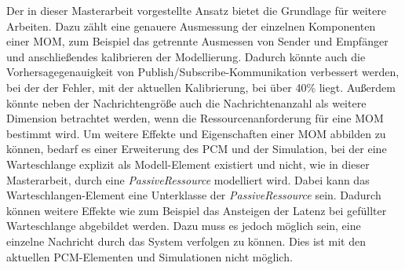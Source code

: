 Der in dieser Masterarbeit vorgestellte Ansatz bietet die Grundlage für weitere Arbeiten. Dazu zählt eine genauere Ausmessung der einzelnen Komponenten einer MOM, zum Beispiel das getrennte Ausmessen von Sender und Empfänger und anschließendes kalibrieren der Modellierung. Dadurch könnte auch die Vorhersagegenauigkeit von Publish/Subscribe-Kommunikation verbessert werden, bei der der Fehler, mit der aktuellen Kalibrierung, bei über 40\% liegt. Außerdem könnte neben der Nachrichtengröße auch die Nachrichtenanzahl als weitere Dimension betrachtet werden, wenn die Ressourcenanforderung für eine MOM bestimmt wird. Um weitere Effekte und Eigenschaften einer MOM abbilden zu können, bedarf es einer Erweiterung des PCM und der Simulation, bei der eine Warteschlange explizit als Modell-Element existiert und nicht, wie in dieser Masterarbeit, durch eine \emph{PassiveRessource} modelliert wird. Dabei kann das Warteschlangen-Element eine Unterklasse der \emph{PassiveRessource} sein. Dadurch können weitere Effekte wie zum Beispiel das Ansteigen der Latenz bei gefüllter Warteschlange abgebildet werden. Dazu muss es jedoch möglich sein, eine einzelne Nachricht durch das System verfolgen zu können. Dies ist mit den aktuellen PCM-Elementen und Simulationen nicht möglich.